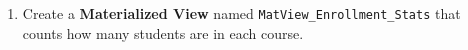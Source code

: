 \documentclass[12pt,a4paper]{article}
\begin{document}
\begin{enumerate}

\item Create a \textbf{Materialized View} named \texttt{MatView\_Enrollment\_Stats} that counts how many students are in each course.



\end{enumerate}
\end{document}
